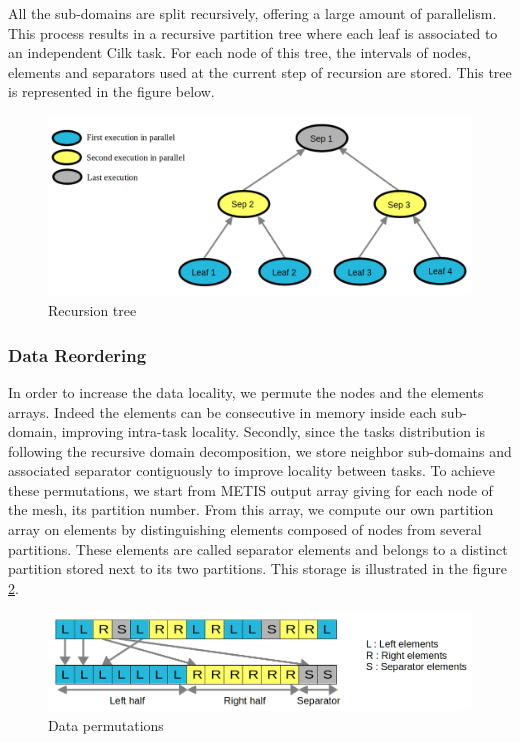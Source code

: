 \documentclass{IOS-Book-Article}
\begin{document}
All the sub-domains are split recursively, offering a large amount of parallelism.
This process results in a recursive partition tree where each leaf is associated to an independent Cilk task.
For each node of this tree, the intervals of nodes, elements and separators used at the current step of recursion are stored.
This tree is represented in the figure below.
\begin{figure}[htp]
 \centering
 \includegraphics[scale=0.25]{Recursion_tree.png}
 \caption{Recursion tree}
 \label{fig:RecTree}
\end{figure}

\subsubsection{Data Reordering}
In order to increase the data locality, we permute the nodes and the elements arrays.
Indeed the elements can be consecutive in memory inside each sub-domain, improving intra-task locality.
Secondly, since the tasks distribution is following the recursive domain decomposition, we store neighbor sub-domains and associated separator contiguously to improve locality between tasks.
To achieve these permutations, we start from METIS output array giving for each node of the mesh, its partition number.
From this array, we compute our own partition array on elements by distinguishing elements composed of nodes from several partitions.
These elements are called separator elements and belongs to a distinct partition stored next to its two partitions.
This storage is illustrated in the figure \ref{fig:dataPermut}.
\begin{figure}[htp]
 \centering
 \includegraphics[scale=0.25]{Data_permutations.png}
 \caption{Data permutations}
 \label{fig:dataPermut}
\end{figure}
\end{document}
